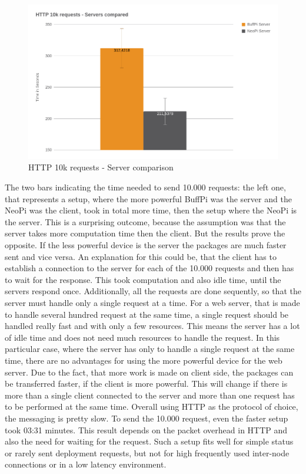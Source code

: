 \begin{figure}[H]
    \centering
    \includegraphics[width=\textwidth]{resources/images/performance_http_server_comparison.png}
    \caption[HTTP 10k requests - Server comparison]{HTTP 10k requests - Server comparison}
    \label{fig:performance_http_server_comparison}
\end{figure}

The two bars indicating the time needed to send 10.000 requests: the left one, that represents a setup, where the more powerful BuffPi was the server and the NeoPi was the client, took in total more time, then the setup where the NeoPi is the server.
This is a surprising outcome, because the assumption was that the server takes more computation time then the client.
But the results prove the opposite.
If the less powerful device is the server the packages are much faster sent and vice versa.
An explanation for this could be, that the client has to establish a connection to the server for each of the 10.000 requests and then has to wait for the response.
This took computation and also idle time, until the servers respond once.
Additionally, all the requests are done sequently, so that the server must handle only a single request at a time.
For a web server, that is made to handle several hundred request at the same time, a single request should be handled really fast and with only a few resources.
This means the server has a lot of idle time and does not need much resources to handle the request.
In this particular case, where the server has only to handle a single request at the same time, there are no advantages for using the more powerful device for the web server.
Due to the fact, that more work is made on client side, the packages can be transferred faster, if the client is more powerful.
This will change if there is more than a single client connected to the server and more than one request has to be performed at the same time.
Overall using \ac{HTTP} as the protocol of choice, the messaging is pretty slow.
To send the 10.000 request, even the faster setup took 03:31 minutes.
This result depends on the packet overhead in \ac{HTTP} and also the need for waiting for the request.
Such a setup fits well for simple status or rarely sent deployment requests, but not for high frequently used inter-node connections or in a low latency environment.

